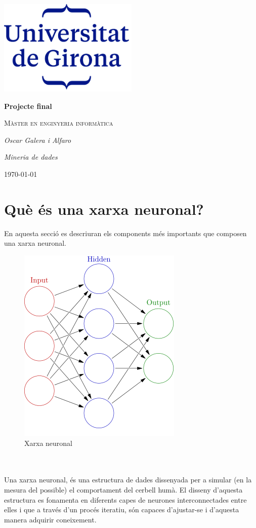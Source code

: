 \documentclass[12pt]{article}
\begin{document}
\begin{titlepage}
		\centering
		\includegraphics[width=0.5\textwidth]{imatges/logo.png}\par\vspace{1cm}
		{\huge\bfseries Projecte final\par}
		\vspace{1cm}
		{\scshape\Large Màster en enginyeria informàtica\par}
		\vspace{1.5cm}
		{\Large\itshape Oscar Galera i Alfaro\par}
		\vspace{1cm}
		{\Large\itshape Mineria de dades\par}
		\vspace{2cm}
		\vfill
		\vfill
		{\large \today\par}
\end{titlepage}
\clearpage
\tableofcontents
\clearpage
\listoffigures


\clearpage
\section{Què és una xarxa neuronal?}
En aquesta secció es descriuran els components més importants que composen una xarxa neuronal.
\begin{figure}[h!]
	\centering
	\includegraphics[scale=.5]{imatges/xnn.png}
	\caption{Xarxa neuronal}
\end{figure}
\\\\Una xarxa neuronal, és una estructura de dades dissenyada per a simular (en la mesura del possible) el comportament del cerbell humà. El disseny d'aquesta estructura es fonamenta en diferents capes de neurones interconnectades entre elles i que a través d'un procés iteratiu, són capaces d'ajustar-se i d'aquesta manera adquirir coneixement.
\end{document}

